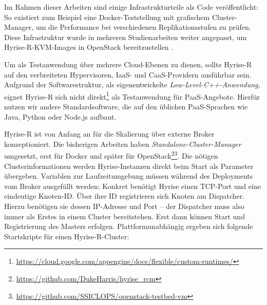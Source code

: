 Im Rahmen dieser Arbeiten sind einige Infrastrukturteile als Code veröffentlicht: So existiert zum Beispiel eine Docker-Teststellung mit grafischem Cluster-Manager, um die Performance bei verschiedenen Replikationsstufen zu prüfen. Diese Infrastruktur wurde in mehreren Studienarbeiten weiter angepasst, um Hyrise-R-KVM-Images in OpenStack bereitzustellen \cite{eschrig:2016:ssiclops-masterproject, maschler:2017:ssiclops-masterproject}.

Um als Testanwendung über mehrere Cloud-Ebenen zu dienen, sollte Hyrise-R auf den verbreiteten Hypervisoren, IaaS- und CaaS-Providern ausführbar sein. Aufgrund der Softwarestruktur, als eigenentwickelte \emph{Low-Level-C++-Anwendung}, eignet Hyrise-R sich nicht direkt\footnote{\url{https://cloud.google.com/appengine/docs/flexible/custom-runtimes/}} als Testanwendung für PaaS-Angebote. Hierfür nutzen wir andere Standardsoftware, die auf den üblichen PaaS-Sprachen wie Java, Python oder Node.js aufbaut.

Hyrise-R ist von Anfang an für die Skalierung über externe Broker konzeptioniert. Die bisherigen Arbeiten haben \emph{Standalone-Cluster-Manager} umgesetzt, erst für Docker und später für OpenStack\footnote{\url{https://github.com/DukeHarris/hyrise_rcm}}\footnote{\url{https://github.com/SSICLOPS/openstack-testbed-vm}}. Die nötigen Clusterinformationen werden Hyrise-Instanzen direkt beim Start als Parameter übergeben. Variablen zur Laufzeitumgebung müssen während des Deployments vom Broker ausgefüllt werden: Konkret benötigt Hyrise einen TCP-Port und eine eindeutige Knoten-ID. Über ihre ID registrieren sich Knoten am Dispatcher. Hierzu benötigen sie dessen IP-Adresse und Port -- der Dispatcher muss also immer als Erstes in einem Cluster bereitstehen. Erst dann können Start und Registrierung des Masters erfolgen. Plattformunabhängig ergeben sich folgende Startskripte für einen Hyrise-R-Cluster:

